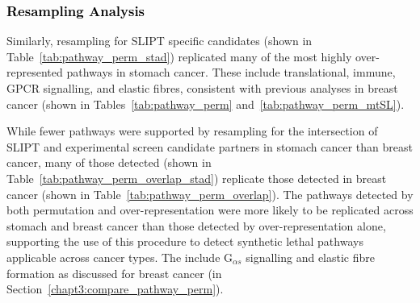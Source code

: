 \subsubsection{\textcolor{black}{Resampling Analysis}}  \label{chapt3:compare_pathway_perm_stad_SL}

Similarly, resampling for \gls{SLIPT} specific candidates (shown in Table~\ref{tab:pathway_perm_stad}) replicated many of the most highly over-represented \glspl{pathway} in stomach cancer. These include translational, immune, \gls{GPCR} signalling, and elastic fibres, consistent with previous analyses in breast cancer (shown in Tables~\ref{tab:pathway_perm} and~\ref{tab:pathway_perm_mtSL}).

While fewer \glspl{pathway} were supported by resampling for the intersection of \gls{SLIPT} and experimental screen \citep{Telford2015} candidate partners in stomach cancer than breast cancer, many of those detected (shown in Table~\ref{tab:pathway_perm_overlap_stad}) replicate those detected in breast cancer (shown in Table~\ref{tab:pathway_perm_overlap}). The \glspl{pathway} detected by both permutation and over-representation were more likely to be replicated across stomach and breast cancer than those detected by over-representation alone, supporting the use of this procedure to detect \gls{synthetic lethal} \glspl{pathway} applicable across cancer types. The include G$_{\alpha s}$ signalling and elastic fibre formation as discussed for breast cancer (in Section~\ref{chapt3:compare_pathway_perm}).

